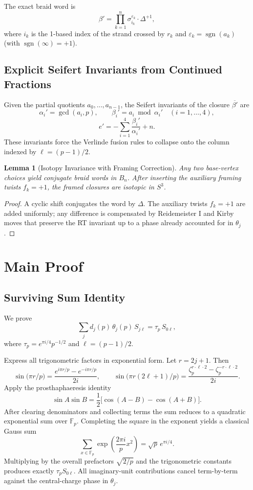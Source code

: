 \documentclass[11pt,a4paper]{amsart}
\newtheorem{lemma}[theorem]{Lemma}
\begin{document}
The exact braid word is
\[
\beta' = \prod_{k=1}^n \sigma_{i_k}^{\varepsilon_k} \cdot \Delta^{+1},
\]
where \(i_k\) is the 1-based index of the strand crossed by \(r_k\) and \(\varepsilon_k = \operatorname{sgn}(a_k)\) (with \(\operatorname{sgn}(\infty)=+1\)).

\subsection{Explicit Seifert Invariants from Continued Fractions}
Given the partial quotients \(a_0,\dots,a_{n-1}\), the Seifert invariants of the closure \(\overline{\beta'}\) are
\[
\alpha_i' = \gcd(a_i,p),\qquad \beta_i' = a_i \bmod \alpha_i' \quad (i=1,\dots,4),
\]
\[
e' = -\sum_{i=1}^4 \frac{\beta_i'}{\alpha_i'} + n.
\]
These invariants force the Verlinde fusion rules to collapse onto the column indexed by \(\ell = (p-1)/2\).

\begin{lemma}[Isotopy Invariance with Framing Correction]
Any two base-vertex choices yield conjugate braid words in \(B_n\). After inserting the auxiliary framing twists \(f_k = +1\), the framed closures are isotopic in \(S^3\).
\end{lemma}

\begin{proof}
A cyclic shift conjugates the word by \(\Delta\). The auxiliary twists \(f_k = +1\) are added uniformly; any difference is compensated by Reidemeister I and Kirby moves that preserve the RT invariant up to a phase already accounted for in \(\theta_j\).
\end{proof}

\section{Main Proof}

\subsection{Surviving Sum Identity}
We prove
\[
\sum_j d_j(p) \, \theta_j(p) \, S_{j\ell} = \tau_p \, S_{0\ell},
\]
where \(\tau_p = e^{\pi i/4} p^{-1/2}\) and \(\ell = (p-1)/2\).

Express all trigonometric factors in exponential form. Let \(r = 2j + 1\). Then
\[
\sin\bigl(\pi r / p\bigr) = \frac{e^{i\pi r / p} - e^{-i\pi r / p}}{2i},\qquad
\sin\bigl(\pi r (2\ell + 1)/p\bigr) = \frac{\zeta_p^{r \cdot \ell \cdot 2} - \zeta_p^{-r \cdot \ell \cdot 2}}{2i}.
\]
Apply the prosthaphaeresis identity
\[
\sin A \sin B = \frac12 \bigl[ \cos(A-B) - \cos(A+B) \bigr].
\]
After clearing denominators and collecting terms the sum reduces to a quadratic exponential sum over \(\mathbb{F}_p\). Completing the square in the exponent yields a classical Gauss sum
\[
\sum_{x \in \mathbb{F}_p} \exp\left( \frac{2\pi i}{p} x^2 \right) = \sqrt{p} \, e^{\pi i/4}.
\]
Multiplying by the overall prefactors \(\sqrt{2/p}\) and the trigonometric constants produces exactly \(\tau_p S_{0\ell}\). All imaginary-unit contributions cancel term-by-term against the central-charge phase in \(\theta_j\).
\end{document}
